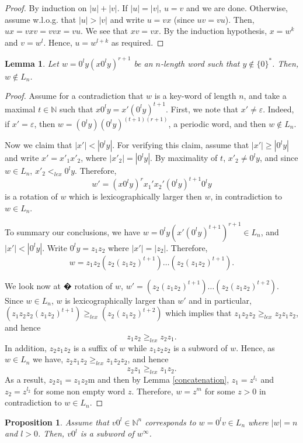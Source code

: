 \documentclass{article}
\newtheorem{proposition}[theorem]{Proposition}
\newtheorem{lemma}[theorem]{Lemma}
\theoremstyle{definition}
\newcommand{\N}{{\mathbb{N}}}
\begin{document}
\begin{proof}
By induction on $|u|+|v|$. If $|u|=|v|$, $u=v$ and we are done. Otherwise, assume w.l.o.g. that $|u|>|v|$ and write $u=vx$ (since $uv=vu$). Then, $ux=vxv=vvx=vu$. We see that $xv=vx$. By the induction hypothesis, $x=w^k$ and $v=w^l$. Hence, $u=w^{l+k}$ as required.
\end{proof}

\begin{lemma}
\label{not-in-Ln}
Let $w=0^ly(x0^ly)^{r+1}$ be an $n$-length word such that $y\notin \{0\}^*$. Then, $w\notin L_n$.
\end{lemma}

\begin{proof}
Assume for a contradiction that $w$ is a key-word of length $n$, and take a maximal $t\in \N$ such that $x0^ly=x'(0^ly)^{t+1}$. First, we note that $x'\neq \varepsilon$. Indeed, if $x'=\varepsilon$, then $w=(0^ly)(0^ly)^{(t+1)(r+1)}$, a periodic word, and then $w\notin L_n$.

Now we claim that $|x'|<|0^ly|$. For verifying this claim, assume that $|x'|\geq |0^ly|$ and write $x'=x'_1x'_2$, where $|x'_2|=|0^ly|$. By maximality of $t$, $x'_2\neq 0^ly$, and since $w\in L_n$, $x'_2<_{lex} 0^ly$. Therefore, $$w'=(x0^ly)^rx_1'x_2'(0^ly)^{t+1}0^ly$$ is a rotation of $w$ which is lexicographically larger then $w$, in contradiction to $w\in L_n$.

To summary our conclusions, we have $w=0^ly(x'(0^ly)^{t+1})^{r+1}\in L_n$, and $|x'|<|0^ly|$. Write $0^ly=z_1z_2$ where $|x'|=|z_2|$. Therefore, $$w=z_1z_2(z_2(z_1z_2)^{t+1})\dots(z_2(z_1z_2)^{t+1}).$$ 

We look now at � rotation of $w$, $w'=(z_2(z_1z_2)^{t+1})\dots(z_2(z_1z_2)^{t+2})$. Since $w\in L_n$, $w$ is lexicographically larger than $w'$ and in particular,
$(z_1z_2z_2(z_1z_2)^{t+1})\geq_{lex}(z_2(z_1z_2)^{t+2})$ which implies that
$z_1z_2z_2\geq_{lex}z_2z_1z_2$, and hence
$$z_1z_2\geq_{lex}z_2z_1.$$
In addition, $z_2z_1z_2$ is a suffix of $w$ while $z_1z_2z_2$ is a subword of $w$. Hence, as $w\in L_n$ we have, $z_2z_1z_2\geq_{lex} z_1z_2z_2$, and hence
$$z_2z_1\geq_{lex}z_1z_2.$$
As a result, $z_2z_1=z_1z_2$m and then by Lemma \ref{concatenation}, $z_1=z^{l_1}$ and $z_2=z^{l_2}$ for some non empty word $z$. Therefore, $w=z^m$ for some $z>0$ in contradiction to $w\in L_n$. 


\end{proof}

\begin{proposition}
Assume that $v0^l\in\mathbb{N}^n$ corresponds to $w=0^lv\in L_n$ where $|w|=n$ and $l>0$. Then, $v0^l$ is a subword of $w^\infty$. 
\end{proposition}
\end{document}
